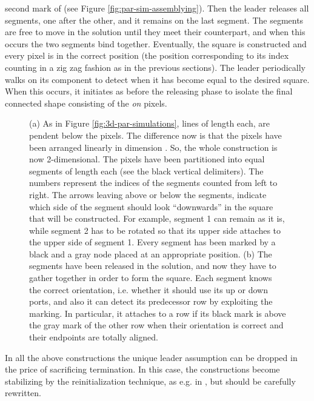 \documentclass[oribibl, 11pt]{llncs}
\begin{document}
second mark of  (see Figure \ref{fig:par-sim-assemblying}). Then the leader releases all segments, one after the other, and it remains on the last segment. The segments are free to move in the solution until they meet their counterpart, and when this occurs the two segments bind together. Eventually, the  square is constructed and every pixel is in the correct position (the position corresponding to its index counting in a zig zag fashion as in the previous sections). The leader periodically walks on its component to detect when it has become equal to the desired square. When this occurs, it initiates as before the releasing phase to isolate the final connected shape consisting of the \emph{on} pixels.   

\begin{figure}[!hbtp]
   \caption{(a) As in Figure \ref{fig:3d-par-simulations},  lines of length  each, are pendent below the  pixels. The difference now is that the pixels have been arranged linearly in dimension . So, the whole construction is now 2-dimensional. The pixels have been partitioned into equal segments of length  each (see the black vertical delimiters). The numbers represent the indices of the segments counted from left to right. The arrows leaving above or below the segments, indicate which side of the segment should look ``downwards'' in the square that will be constructed. For example, segment 1 can remain as it is, while segment 2 has to be rotated so that its upper side attaches to the upper side of segment 1. Every segment has been marked by a black and a gray node placed at an appropriate position. (b) The segments have been released in the solution, and now they have to gather together in order to form the square. Each segment knows the correct orientation, i.e. whether it should use its up or down ports, and also it can detect its predecessor row by exploiting the marking. In particular, it attaches to a row if its black mark is above the gray mark of the other row when their orientation is correct and their endpoints are totally aligned.} \label{fig:linear-par}
\end{figure}


\begin{remark}
In all the above constructions the unique leader assumption can be dropped in the price of sacrificing termination. In this case, the constructions become stabilizing by the reinitialization technique, as e.g. in \cite{MS14}, but should be carefully rewritten.
\end{remark}
\end{document}
